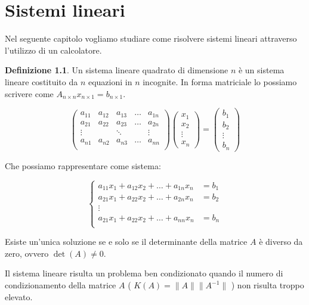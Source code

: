 \documentclass[12pt, a4paper]{book}
\theoremstyle{definition}
\newtheorem{defn}{Definizione}[section]
\begin{document}
\chapter{Sistemi lineari}
\begin{flushleft}
Nel seguente capitolo vogliamo studiare come risolvere sistemi lineari attraverso l'utilizzo di un calcolatore.
\begin{defn}
	Un sistema lineare quadrato di dimensione $n$ è un sistema lineare costituito da $n$ equazioni in $n$ incognite.  In forma matriciale lo possiamo scrivere come $A_{n \times n} x_{n \times 1} = b_{n \times 1}$.
	
	\[ 
		\begin{pmatrix}
			a_{11} & a_{12} & a_{13} & \dots & a_{1n} \\
			a_{21} & a_{22} & a_{23} & \dots & a_{2n} \\
			\vdots & & \ddots & & \vdots \\
			a_{n1} & a_{n2} & a_{n3} & \dots & a_{nn} \\
		\end{pmatrix}	
		\begin{pmatrix}
			x_{1}  \\
			x_{2}  \\
			\vdots  \\
			x_{n}
		\end{pmatrix}
		= 
		\begin{pmatrix}
			b_{1}  \\
			b_{2}  \\
			\vdots  \\
			b_{n}
		\end{pmatrix}		
	\]

Che possiamo rappresentare come sistema: 

	\[ 
			\begin{cases}
  				a_{11}x_{1} + a_{12}x_{2}  + \dots + a_{1n}x_{n} &= b_{1} \\
       			a_{21}x_{1} + a_{22}x_{2}  + \dots + a_{2n}x_{n} &= b_{2} \\
       			\vdots \\
  				a_{21}x_{1} + a_{22}x_{2}  + \dots + a_{nn}x_{n} &= b_{n} \\
			\end{cases}
	\]

Esiste un'unica soluzione se e solo se il determinante della matrice $A$ è diverso da zero, ovvero $\det(A) \neq 0$.
\end{defn}

Il sistema lineare risulta un problema ben condizionato quando il numero di condizionamento della matrice $A$ ( $K(A) = \lVert A \rVert \lVert A^{-1} \rVert$ ) non risulta troppo elevato.
\end{flushleft}
\end{document}
